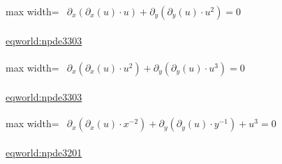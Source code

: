 \documentclass[10pt,a4paper]{article}
\begin{document}
\begin{minipage}{\linewidth}
\begin{center}\begin{adjustbox}{max width=\linewidth}$\displaystyle\begin{gathered}\begin{gathered}\partial_{x}(\partial_{x}(u)\cdot u)+\partial_{y}(\partial_{y}(u)\cdot u^{2})=0\end{gathered}\end{gathered}$\end{adjustbox}\end{center}
{\small \href{https://eqworld.ipmnet.ru/en/solutions/npde/npde3303.pdf}{eqworld:npde3303}}\par
\end{minipage}\par\vspace{7mm}

\begin{minipage}{\linewidth}
\begin{center}\begin{adjustbox}{max width=\linewidth}$\displaystyle\begin{gathered}\begin{gathered}\partial_{x}(\partial_{x}(u)\cdot u^{2})+\partial_{y}(\partial_{y}(u)\cdot u^{3})=0\end{gathered}\end{gathered}$\end{adjustbox}\end{center}
{\small \href{https://eqworld.ipmnet.ru/en/solutions/npde/npde3303.pdf}{eqworld:npde3303}}\par
\end{minipage}\par\vspace{7mm}

\begin{minipage}{\linewidth}
\begin{center}\begin{adjustbox}{max width=\linewidth}$\displaystyle\begin{gathered}\begin{gathered}\partial_{x}(\partial_{x}(u)\cdot x^{-2})+\partial_{y}(\partial_{y}(u)\cdot y^{-1})+u^{3}=0\end{gathered}\end{gathered}$\end{adjustbox}\end{center}
{\small \href{https://eqworld.ipmnet.ru/en/solutions/npde/npde3201.pdf}{eqworld:npde3201}}\par
\end{minipage}\par\vspace{7mm}
\end{document}
